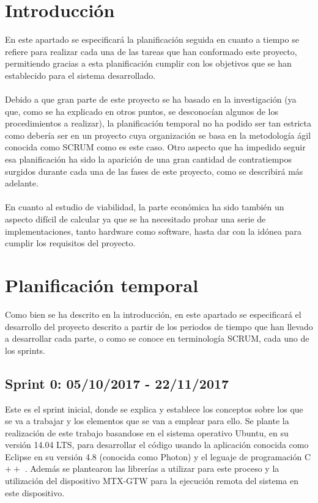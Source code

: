 
\section{Introducción}
En este apartado se especificará la planificación seguida en cuanto a tiempo se refiere para realizar cada una de las tareas que han conformado este proyecto, permitiendo gracias a esta planificación cumplir con los objetivos que se han establecido para el sistema desarrollado.\\
\\
Debido a que gran parte de este proyecto se ha basado en la investigación (ya que, como se ha explicado en otros puntos, se desconocían algunos de los procedimientos a realizar), la planificación temporal no ha podido ser tan estricta como debería ser en un proyecto cuya organización se basa en la metodología ágil conocida como SCRUM como es este caso. Otro aspecto que ha impedido seguir esa planificación ha sido la aparición de una gran cantidad de contratiempos surgidos durante cada una de las fases de este proyecto, como se describirá más adelante.\\
\\
En cuanto al estudio de viabilidad, la parte económica ha sido también un aspecto difícil de calcular ya que se ha necesitado probar una serie de implementaciones, tanto hardware como software, hasta dar con la idónea para cumplir los requisitos del proyecto.\\
 
\section{Planificación temporal}
Como bien se ha descrito en la introducción, en este apartado se especificará el desarrollo del proyecto descrito a partir de los periodos de tiempo que han llevado a desarrollar cada parte, o como se conoce en terminología SCRUM, cada uno de los sprints.\\

\subsection{Sprint 0: 05/10/2017 - 22/11/2017}
Este es el sprint inicial, donde se explica y establece los conceptos sobre los que se va a trabajar y los elementos que se van a emplear para ello. Se plante la realización de este trabajo basandose en el sistema operativo Ubuntu, en su versión 14.04 LTS, para desarrollar el código usando la aplicación conocida como Eclipse en su versión 4.8 (conocida como Photon) y el leguaje de programación C$++$ \cite{wikiCpp}. Además se plantearon las librerías a utilizar para este proceso y la utilización del dispositivo MTX-GTW para la ejecución remota del sistema en este dispositivo.\\
